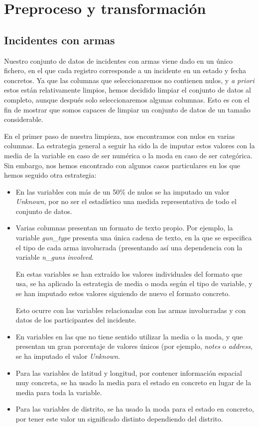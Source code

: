 \documentclass[11pt,a4paper]{article}
\begin{document}
\section{Preproceso y transformación}

\subsection{Incidentes con armas}

Nuestro conjunto de datos de incidentes con armas viene dado en un único fichero, en el que cada registro corresponde a un incidente en un estado y fecha concretos. Ya que las columnas que seleccionaremos no contienen nulos, y \textit{a priori} estos están relativamente limpios, hemos decidido limpiar el conjunto de datos al completo, aunque después solo seleccionaremos algunas columnas. Esto es con el fin de mostrar que somos capaces de limpiar un conjunto de datos de un tamaño considerable.

En el primer paso de nuestra limpieza, nos encontramos con nulos en varias columnas. La estrategia general a seguir ha sido la de imputar estos valores con la media de la variable en caso de ser numérica o la moda en caso de ser categórica. Sin embargo, nos hemos encontrado con algunos casos particulares en los que hemos seguido otra estrategia:

\begin{itemize}
    \item En las variables con más de un 50\% de nulos se ha imputado un valor \textit{Unknown}, por no ser el estadístico una medida representativa de todo el conjunto de datos.
    
    \item Varias columnas presentan un formato de texto propio. Por ejemplo, la variable \textit{gun\_type} presenta una única cadena de texto, en la que se especifica el tipo de cada arma involucrada (presentando así una dependencia con la variable \textit{n\_guns involved}.

    En estas variables se han extraído los valores individuales del formato que usa, se ha aplicado la estrategia de media o moda según el tipo de variable, y se han imputado estos valores siguiendo de nuevo el formato concreto.

    Esto ocurre con las variables relacionadas con las armas involucradas y con datos de los participantes del incidente.

    \item En variables en las que no tiene sentido utilizar la media o la moda, y que presentan un gran porcentaje de valores únicos (por ejemplo, \textit{notes} o \textit{address}, se ha imputado el valor \textit{Unknown}.

    \item Para las variables de latitud y longitud, por contener información espacial muy concreta, se ha usado la media para el estado en concreto en lugar de la media para toda la variable.

    \item Para las variables de distrito, se ha usado la moda para el estado en concreto, por tener este valor un significado distinto dependiendo del distrito.
\end{itemize}
\end{document}
